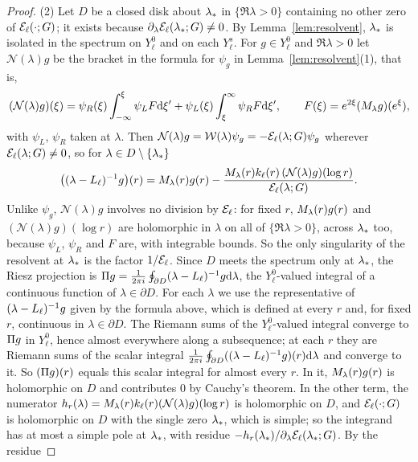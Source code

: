 \begin{proof}
(2) Let $D$ be a closed disk about $\lambda_*$ in $\{\Re\lambda>0\}$ containing no
other zero of $\mathcal{E}_\ell(\cdot;G)$; it exists because
$\partial_\lambda\mathcal{E}_\ell(\lambda_*;G)\ne0$. By Lemma~\ref{lem:resolvent}, $\lambda_*$
is isolated in the spectrum on $Y^0_\ell$ and on each $Y^s_\ell$. For $g\in Y^0_\ell$
and $\Re\lambda>0$ let $\mathcal N(\lambda)g$ be the bracket in the formula for
$\psi_g$ in Lemma~\ref{lem:resolvent}(1), that is,
\[
(\mathcal N(\lambda)g)(\xi)=\psi_R(\xi)\int_{-\infty}^{\xi}\psi_LF\dd\xi'+\psi_L(\xi)\int_{\xi}^{\infty}\psi_RF\dd\xi',
\qquad F(\xi)=e^{2\xi}(M_\lambda g)(e^\xi),
\]
with $\psi_L$, $\psi_R$ taken at $\lambda$. Then $\mathcal N(\lambda)g=\mathcal{W}(\lambda)\psi_g
=-\mathcal{E}_\ell(\lambda;G)\psi_g$ wherever $\mathcal{E}_\ell(\lambda;G)\ne0$, so for
$\lambda\in D\setminus\{\lambda_*\}$
\[
\big((\lambda-L_{\ell})^{-1}g\big)(r)=M_\lambda(r)g(r)
-\frac{M_\lambda(r)k_\ell(r)\,(\mathcal N(\lambda)g)(\log r)}{\mathcal{E}_\ell(\lambda;G)} .
\]
Unlike $\psi_g$, $\mathcal N(\lambda)g$ involves no division by $\mathcal{E}_\ell$: for fixed
$r$, $M_\lambda(r)g(r)$ and $(\mathcal N(\lambda)g)(\log r)$ are holomorphic in
$\lambda$ on all of $\{\Re\lambda>0\}$, across $\lambda_*$ too, because $\psi_L$,
$\psi_R$ and $F$ are, with integrable bounds. So the only singularity of the
resolvent at $\lambda_*$ is the factor $1/\mathcal{E}_\ell$.
Since $D$ meets the spectrum only at $\lambda_*$, the Riesz projection is
$\Pi g=\frac1{2\pi i}\oint_{\partial D}(\lambda-L_{\ell})^{-1}g\dd\lambda$, the
$Y^0_\ell$-valued integral of a continuous function of $\lambda\in\partial D$. For
each $\lambda$ we use the representative of $(\lambda-L_{\ell})^{-1}g$ given by
the formula above, which is defined at every $r$ and, for fixed $r$, continuous in
$\lambda\in\partial D$. The Riemann sums of the $Y^0_\ell$-valued integral converge
to $\Pi g$ in $Y^0_\ell$, hence almost everywhere along a subsequence; at each
$r$ they are Riemann sums of the scalar integral
$\frac1{2\pi i}\oint_{\partial D}((\lambda-L_{\ell})^{-1}g)(r)\dd\lambda$ and
converge to it. So $(\Pi g)(r)$ equals this scalar integral for almost every
$r$. In it, $M_\lambda(r)g(r)$ is holomorphic on $D$ and contributes $0$ by
Cauchy's theorem. In the other term, the numerator
$h_r(\lambda)=M_\lambda(r)k_\ell(r)(\mathcal N(\lambda)g)(\log r)$ is
holomorphic on $D$, and $\mathcal{E}_\ell(\cdot;G)$ is holomorphic on $D$ with the single
zero $\lambda_*$, which is simple; so the integrand has at most a simple pole at $\lambda_*$, with
residue $-h_r(\lambda_*)/\partial_\lambda\mathcal{E}_\ell(\lambda_*;G)$. By the residue

\end{proof}
